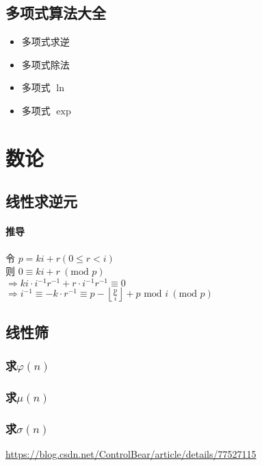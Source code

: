 \documentclass{article}
\begin{document}
		\subsection{多项式算法大全}
		\begin{itemize}
			\item 多项式求逆
			\item 多项式除法
			\item 多项式 \(\ln\)
			\item 多项式 \(\exp\)
		\end{itemize}
		

\newpage

	\section{数论}
		\subsection{线性求逆元}
			\paragraph{推导}
			令 $p = ki + r (0 \le r < i)$ \\
			则 $0 \equiv ki + r \: (\text{mod } p)$ \\
			$\Rightarrow ki \cdot i^{-1} r^{-1} + r \cdot i^{-1} r^{-1} \equiv 0$ \\
			$\Rightarrow i^{-1} \equiv -k \cdot r^{-1} \equiv p - \left\lfloor \frac{p}{i}\right\rfloor + p \text{ mod } i \: ( \text{mod } p )$
			
			
		\subsection{线性筛}
			\subsubsection{求$\varphi(n)$}
			
			\subsubsection{求$\mu(n)$}
			
			\subsubsection{求\(\sigma(n)\)}
			\url{https://blog.csdn.net/ControlBear/article/details/77527115}
			
\end{document}
